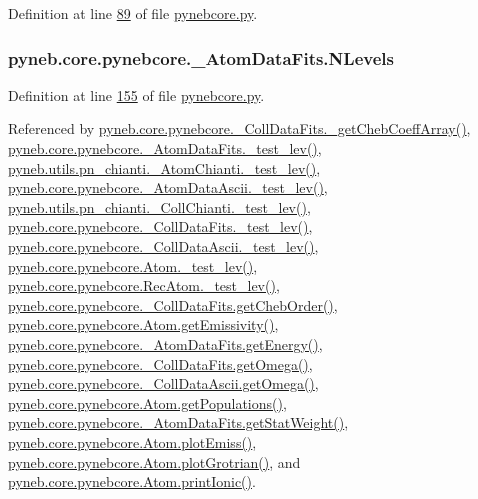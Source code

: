 Definition at line \hyperlink{pynebcore_8py_source_l00089}{89} of file \hyperlink{pynebcore_8py_source}{pynebcore.\+py}.

\hypertarget{classpyneb_1_1core_1_1pynebcore_1_1___atom_data_fits_a85c3a2d0c1cdbecc851be17237caff63}{}
\subsubsection[{N\+Levels}]{\setlength{\rightskip}{0pt plus 5cm}pyneb.\+core.\+pynebcore.\+\_\+\+Atom\+Data\+Fits.\+N\+Levels}\label{classpyneb_1_1core_1_1pynebcore_1_1___atom_data_fits_a85c3a2d0c1cdbecc851be17237caff63}


Definition at line \hyperlink{pynebcore_8py_source_l00155}{155} of file \hyperlink{pynebcore_8py_source}{pynebcore.\+py}.



Referenced by \hyperlink{pynebcore_8py_source_l00734}{pyneb.\+core.\+pynebcore.\+\_\+\+Coll\+Data\+Fits.\+\_\+get\+Cheb\+Coeff\+Array()}, \hyperlink{pynebcore_8py_source_l00171}{pyneb.\+core.\+pynebcore.\+\_\+\+Atom\+Data\+Fits.\+\_\+test\+\_\+lev()}, \hyperlink{pn__chianti_8py_source_l00284}{pyneb.\+utils.\+pn\+\_\+chianti.\+\_\+\+Atom\+Chianti.\+\_\+test\+\_\+lev()}, \hyperlink{pynebcore_8py_source_l00435}{pyneb.\+core.\+pynebcore.\+\_\+\+Atom\+Data\+Ascii.\+\_\+test\+\_\+lev()}, \hyperlink{pn__chianti_8py_source_l00449}{pyneb.\+utils.\+pn\+\_\+chianti.\+\_\+\+Coll\+Chianti.\+\_\+test\+\_\+lev()}, \hyperlink{pynebcore_8py_source_l00660}{pyneb.\+core.\+pynebcore.\+\_\+\+Coll\+Data\+Fits.\+\_\+test\+\_\+lev()}, \hyperlink{pynebcore_8py_source_l01026}{pyneb.\+core.\+pynebcore.\+\_\+\+Coll\+Data\+Ascii.\+\_\+test\+\_\+lev()}, \hyperlink{pynebcore_8py_source_l01459}{pyneb.\+core.\+pynebcore.\+Atom.\+\_\+test\+\_\+lev()}, \hyperlink{pynebcore_8py_source_l02596}{pyneb.\+core.\+pynebcore.\+Rec\+Atom.\+\_\+test\+\_\+lev()}, \hyperlink{pynebcore_8py_source_l00694}{pyneb.\+core.\+pynebcore.\+\_\+\+Coll\+Data\+Fits.\+get\+Cheb\+Order()}, \hyperlink{pynebcore_8py_source_l01716}{pyneb.\+core.\+pynebcore.\+Atom.\+get\+Emissivity()}, \hyperlink{pynebcore_8py_source_l00268}{pyneb.\+core.\+pynebcore.\+\_\+\+Atom\+Data\+Fits.\+get\+Energy()}, \hyperlink{pynebcore_8py_source_l00811}{pyneb.\+core.\+pynebcore.\+\_\+\+Coll\+Data\+Fits.\+get\+Omega()}, \hyperlink{pynebcore_8py_source_l01063}{pyneb.\+core.\+pynebcore.\+\_\+\+Coll\+Data\+Ascii.\+get\+Omega()}, \hyperlink{pynebcore_8py_source_l01496}{pyneb.\+core.\+pynebcore.\+Atom.\+get\+Populations()}, \hyperlink{pynebcore_8py_source_l00242}{pyneb.\+core.\+pynebcore.\+\_\+\+Atom\+Data\+Fits.\+get\+Stat\+Weight()}, \hyperlink{pynebcore_8py_source_l02313}{pyneb.\+core.\+pynebcore.\+Atom.\+plot\+Emiss()}, \hyperlink{pynebcore_8py_source_l02372}{pyneb.\+core.\+pynebcore.\+Atom.\+plot\+Grotrian()}, and \hyperlink{pynebcore_8py_source_l02167}{pyneb.\+core.\+pynebcore.\+Atom.\+print\+Ionic()}.

